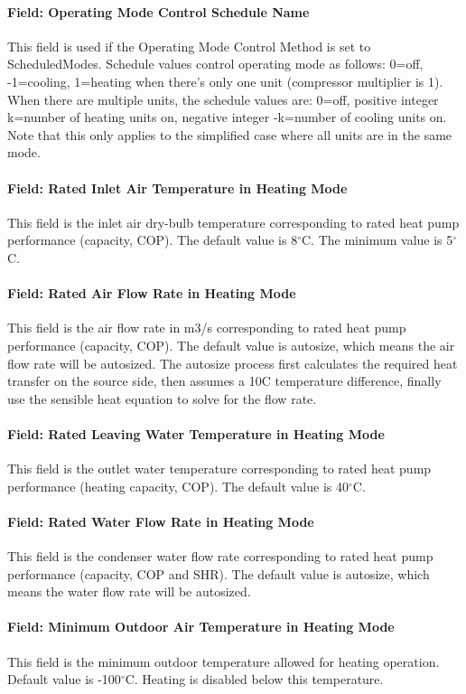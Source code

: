 \paragraph{Field: Operating Mode Control Schedule Name} This field is used if
the Operating Mode Control Method is set to ScheduledModes. Schedule values
control operating mode as follows: 0=off, -1=cooling, 1=heating when there's
only one unit (compressor multiplier is 1). When there are multiple units, the
schedule values are: 0=off, positive integer k=number of heating units on,
negative integer -k=number of cooling units on. Note that this only applies to
the simplified case where all units are in the same mode.
\paragraph{Field: Rated Inlet Air Temperature in Heating Mode} This field is the
inlet air dry-bulb temperature corresponding to rated heat pump performance
(capacity, COP). The default value is 8$^\circ$C. The minimum value is
5$^\circ$C.
\paragraph{Field: Rated Air Flow Rate in Heating Mode} This field is the air
flow rate in m3/s corresponding to rated heat pump performance (capacity, COP).
The default value is autosize, which means the air flow rate will be autosized.
The autosize process first calculates the required heat transfer on the source
side, then assumes a 10C temperature difference, finally use the sensible heat
equation to solve for the flow rate.
\paragraph{Field: Rated Leaving Water Temperature in Heating Mode} This field is
the outlet water temperature corresponding to rated heat pump performance
(heating capacity, COP). The default value is 40$^\circ$C.
\paragraph{Field: Rated Water Flow Rate in Heating Mode} This field is the
condenser water flow rate corresponding to rated heat pump performance
(capacity, COP and SHR). The default value is autosize, which means the water
flow rate will be autosized.
\paragraph{Field: Minimum Outdoor Air Temperature in Heating Mode} This field is
the minimum outdoor temperature allowed for heating operation. Default value is
-100$^\circ$C. Heating is disabled below this temperature.
